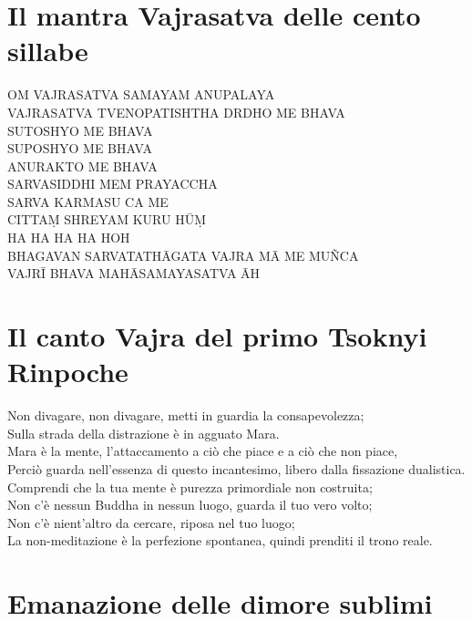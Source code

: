 \section{Il mantra Vajrasatva delle cento sillabe}
\vspace*{-1em}\noindent{}

OM VAJRASATVA SAMAYAM ANUPALAYA \\
VAJRASATVA TVENOPATISHTHA DRDHO ME BHAVA \\
SUTOSHYO ME BHAVA \\
SUPOSHYO ME BHAVA \\
ANURAKTO ME BHAVA \\
SARVASIDDHI MEM PRAYACCHA \\
SARVA KARMASU CA ME \\
CITTAṂ SHREYAM KURU HŪṂ \\
HA HA HA HA HOH \\
BHAGAVAN SARVATATHĀGATA VAJRA MĀ ME MUÑCA \\
VAJRĪ BHAVA MAHĀSAMAYASATVA ĀH

\section{Il canto Vajra del primo Tsoknyi Rinpoche}
\vspace*{-1em}\noindent{}

Non divagare, non divagare, metti in guardia la consapevolezza; \\
Sulla strada della distrazione è in agguato Mara. \\
Mara è la mente, l'attaccamento a ciò che piace e a ciò che non piace, \\
Perciò guarda nell'essenza di questo incantesimo, libero dalla fissazione dualistica. \\
Comprendi che la tua mente è purezza primordiale non costruita; \\
Non c'è nessun Buddha in nessun luogo, guarda il tuo vero volto; \\
Non c'è nient'altro da cercare, riposa nel tuo luogo; \\
La non-meditazione è la perfezione spontanea, quindi prenditi il trono reale.

\newpage

\section{Emanazione delle dimore sublimi}
\vspace*{-1em}\noindent{}

